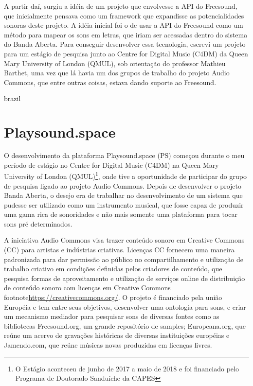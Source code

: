 A partir daí, surgiu a idéia de um projeto que envolvesse a API do Freesound, que inicialmente pensava como um framework que expandisse as potencialidades sonoras deste projeto. A idéia inicial foi o de usar a API do Freesound como um método para mapear os sons em letras, que iriam ser acessadas dentro do sistema do Banda Aberta. Para conseguir desenvolver essa tecnologia, escrevi um projeto para um estágio de pesquisa junto ao Centre for Digital Music (C4DM) da Queen Mary University of London (QMUL),  sob orientação do professor Mathieu Barthet, uma vez que lá havia um dos grupos de trabalho do projeto Audio Commons, que entre outras coisas, estava dando suporte ao Freesound. 

\begin{otherlanguage*}{brazil}

\section{Playsound.space}

O desenvolvimento da plataforma Playsound.space (PS) começou durante o meu período de estágio no Centre for Digital Music (C4DM) na Queen Mary University of London (QMUL)\footnote{O Estágio aconteceu de junho de 2017 a maio de 2018 e foi financiado pelo Programa de Doutorado Sanduíche da CAPES}, onde tive a oportunidade de participar do grupo de pesquisa ligado ao projeto Audio Commons\cite{Font2016}. Depois de desenvolver o projeto Banda Aberta, o desejo era de trabalhar no desenvolvimento de um sistema que pudesse ser utilizado como um instrumento musical, que fosse capaz de produzir uma gama rica de sonoridades e não mais somente uma plataforma para tocar sons pré determinados. 

A iniciativa Audio Commons visa trazer conteúdo sonoro em Creative Commons (CC) para artistas e indústrias criativas. Licenças CC fornecem uma maneira padronizada para dar permissão ao público no compartilhamento e utilização de trabalho criativo em condições definidas pelos criadores de conteúdo, que pesquisa formas de aproveitamento e utilização de serviços online de distribuição de conteúdo sonoro com licenças em Creative Commons footnote{\url{https://creativecommons.org/}}. O projeto é financiado pela união Européia e tem entre seus objetivos, desenvolver uma ontologia para sons, e criar um mecanismo mediador para pesquisar sons de diversas fontes como as bibliotecas Freesound.org, um grande repositório de samples; Europeana.org, que reúne um acervo de gravações históricas de diversas instituições européias e Jamendo.com, que reúne músicas novas produzidas em licenças livres.



\end{otherlanguage*}
